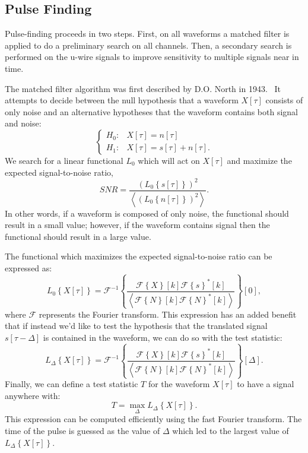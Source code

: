 \subsection{Pulse Finding}\label{sec:ReconPulseFinding}

Pulse-finding proceeds in two steps.  First, on all waveforms a matched filter is applied to do a preliminary search on all channels.  Then, a secondary search is performed on the u-wire signals to improve sensitivity to multiple signals near in time.

The matched filter algorithm was first described by D.O. North in 1943.~\cite{MatchedFilterPaper}  It attempts to decide between the null hypothesis that a waveform $X[\tau]$ consists of only noise and an alternative hypotheses that the waveform contains both signal and noise:
\begin{equation}\begin{cases}
H_0: & X[\tau] = n[\tau]\\
H_1: & X[\tau] = s[\tau] + n[\tau].
\end{cases}\end{equation}
We search for a linear functional $L_0$ which will act on $X[\tau]$ and maximize the expected signal-to-noise ratio,
\begin{equation}
SNR = \frac{\left(L_0\left\{s[\tau]\right\}\right)^2} {\left<\left(L_0\left\{n[\tau]\right\}\right)^2\right>}.
\end{equation}
In other words, if a waveform is composed of only noise, the functional should result in a small value; however, if the waveform contains signal then the functional should result in a large value.

The functional which maximizes the expected signal-to-noise ratio can be expressed as:
\begin{equation}
L_0\left\{X[\tau]\right\} = \mathcal{F}^{-1}\left\{ \frac{\mathcal{F}\left\{X\right\}[k] \mathcal{F}\left\{s\right\}^{*}[k]}{\left<\mathcal{F}\left\{N\right\}[k]\mathcal{F}\left\{N\right\}^{*}[k]\right>}\right\}[0],
\end{equation}
where $\mathcal{F}$ represents the Fourier transform.  This expression has an added benefit that if instead we'd like to test the hypothesis that the translated signal $s[\tau - \Delta]$ is contained in the waveform, we can do so with the test statistic:
\begin{equation}
L_\Delta\left\{X[\tau]\right\} = \mathcal{F}^{-1}\left\{ \frac{\mathcal{F}\left\{X\right\}[k] \mathcal{F}\left\{s\right\}^{*}[k]}{\left<\mathcal{F}\left\{N\right\}[k]\mathcal{F}\left\{N\right\}^{*}[k]\right>}\right\}[\Delta].
\end{equation}
Finally, we can define a test statistic $T$ for the waveform $X[\tau]$ to have a signal anywhere with:
\begin{equation}
T = \max_{\Delta} L_\Delta\left\{X[\tau]\right\}.
\end{equation}
This expression can be computed efficiently using the fast Fourier transform.  The time of the pulse is guessed as the value of $\Delta$ which led to the largest value of $L_\Delta\left\{X[\tau]\right\}$.

